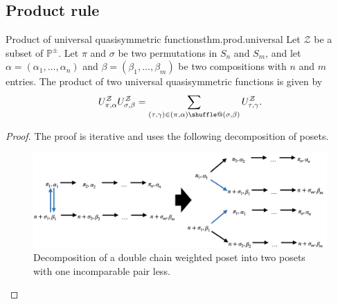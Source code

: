 \documentclass[numbers=enddot,12pt,final,onecolumn,notitlepage]{scrartcl}%
\makeatletter
\newcommand{\al}{\alpha}
\newcommand{\be}{\beta}
\newcommand{\PP}{\mathbb{P}} %
\providecommand*{\shuffle}{%
  \mathbin{\mathpalette\shuffle@{}}%
}
\newcommand*{\shuffle@}[2]{%
  \sbox0{$#1\vcenter{}$}%
  \kern .15\ht0 %
  \rlap{\vrule height .25\ht0 depth 0pt width 2.5\ht0}%
  \raise.1\ht0\hbox to 2.5\ht0{%
    \vrule height 1.75\ht0 depth -.1\ht0 width .17\ht0 %
    \hfill
    \vrule height 1.75\ht0 depth -.1\ht0 width .17\ht0 %
    \hfill
    \vrule height 1.75\ht0 depth -.1\ht0 width .17\ht0 %
  }%
  \kern .15\ht0 %
}
\newcommand{\0}{\phantom{c}}
\let\sumnonlimits\sum
\renewcommand{\sum}{\sumnonlimits\limits}
\makeatother
\begin{document}
\subsection{Product rule}
\begin{theorem}{Product of universal quasisymmetric functions}{thm.prod.universal}
Let $\mathcal{Z}$ be a subset of $\PP^{\pm}$.
Let $\pi$ and $\sigma$ be two permutations in $S_n$ and $S_m$, and let $\alpha = (\al_1,\dots,\al_n)$ and $\beta = (\be_1,\dots,\be_m)$ be two compositions with $n$ and $m$ entries.
The product of two universal quasisymmetric functions is given by
\begin{equation}
\label{eq : UU}
U^\mathcal{Z}_{\pi,\alpha}U^\mathcal{Z}_{\sigma,\beta}=\sum_{(\tau,\gamma)\in(\pi,\alpha)\shuffle(\sigma,\beta)}U^\mathcal{Z}_{\tau,\gamma} .
\end{equation}
\end{theorem}
\begin{proof}
The proof is iterative and uses the following decomposition of posets.
%
\begin{figure}[htbp]
\begin{center}
 \includegraphics[scale=0.22]{PosetBij.png}\caption{Decomposition of a double chain weighted poset into two posets with one incomparable pair less.}
 \label{fig : prodmonomial}
 \end{center}
 \end{figure}
\end{proof}

\end{document}
